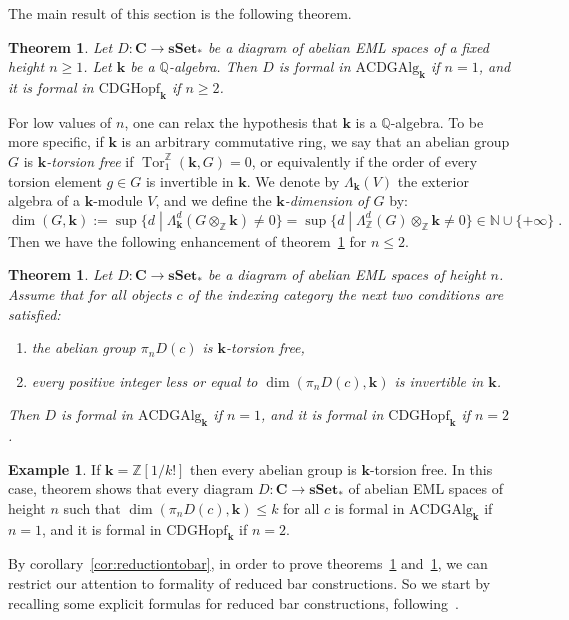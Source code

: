 \documentclass{amsart}
\newtheorem{theorem}[formula]{Theorem}
\theoremstyle{definition}
\newtheorem{example}[formula]{Example}
\theoremstyle{remark}
\newcommand{\Z}{\mathbb Z}
\newcommand{\Q}{\mathbb Q}
\newcommand{\N}{\mathbb N}
\DeclareMathOperator{\Tor}{Tor}
\renewcommand{\ge}{\geqslant}
\renewcommand{\le}{\leqslant}
\newcommand{\Cc}{\mathbf{C}}
\newcommand{\sset}{\mathbf{sSet}}
\def\k{\mathbf{k}}
\begin{document}
The main result of this section is the following theorem.

\begin{theorem}\label{thm:formQ}
	Let $D\colon\Cc\to \sset_*$ be a diagram of abelian EML spaces of a fixed height $n\ge 1$. Let $\k$ be a $\Q$-algebra.
	Then $D$ is formal in $\mathrm{ACDGAlg}_\k$ if $n=1$, and it is formal in $\mathrm{CDGHopf}_\k$ if $n\ge 2$. 
\end{theorem}

For low values of $n$, one can relax the hypothesis that $\k$ is a $\Q$-algebra. To be more specific, if $\k$ is an arbitrary commutative ring, we say that an abelian group $G$ is \emph{$\k$-torsion free} if $\Tor_1^\Z(\k,G)=0$, or equivalently if the order of every torsion element $g\in G$ is invertible in $\k$. We denote by $\Lambda_\k(V)$ the exterior algebra of a $\k$-module $V$, and we define the \emph{$\k$-dimension of $G$} by: 
\[
	\dim(G,\k):=\sup\{d \;|\; \Lambda_\k^d(G\otimes_\Z\k)\ne 0\} = \sup\{d \;|\; \Lambda_\Z^d(G)\otimes_\Z\k \ne 0\} \in \N\cup\{+\infty\}\;.
\] 
Then we have the following enhancement of theorem~\ref{thm:formQ} for $n\le 2$.

\begin{theorem}\label{thm:formsmalldim}
	Let $D:\Cc\to \sset_*$ be a diagram of abelian EML spaces of height $n$. Assume that for all objects $c$ of the indexing category the next two conditions are satisfied:
	\begin{enumerate}
		\item[(1)] the abelian group $\pi_nD(c)$ is $\k$-torsion free,
		\item[(2)] every positive integer less or equal to $\dim(\pi_nD(c),\k)$ is invertible in $\k$.
	\end{enumerate}
	Then $D$ is formal in $\mathrm{ACDGAlg}_\k$ if $n=1$, and it is formal in $\mathrm{CDGHopf}_\k$ if $n= 2$.   
\end{theorem}

\begin{example}\label{ex:kfact}
	If $\k=\Z[1/k!]$ then every abelian group is $\k$-torsion free. In this case, theorem shows that every diagram $D:\Cc\to \sset_*$ of abelian EML spaces of height $n$ such that $\dim(\pi_nD(c),\k)\le k$ for all $c$ is formal in $\mathrm{ACDGAlg}_\k$ if $n=1$, and it is formal in $\mathrm{CDGHopf}_\k$ if $n= 2$.   
\end{example}

By corollary~\ref{cor:reductiontobar}, in order to prove theorems~\ref{thm:formQ} and~\ref{thm:formsmalldim}, we can restrict our attention to formality of reduced bar constructions. So we start by recalling some explicit formulas for reduced bar constructions, following~\cite{gu-ma-74}.
\end{document}
